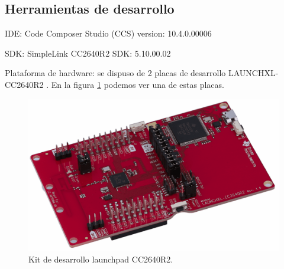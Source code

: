 \begin{enumerate}
\end{enumerate}

\subsection{Herramientas de desarrollo}
IDE: Code Composer Studio (CCS) version: 10.4.0.00006

SDK: SimpleLink CC2640R2 SDK: 5.10.00.02

Plataforma de hardware: se dispuso de 2 placas de desarrollo LAUNCHXL-CC2640R2 \citep{REF}. En la figura \ref{fig:kitDesarrolloCC2640R2} podemos ver una de estas placas.



\vspace{1cm}

\begin{figure}[htbp]
	\centering
	\includegraphics[width=.7\textwidth]{./Figures/LaunchpadCC2640R2.png}
	\caption{Kit de desarrollo launchpad CC2640R2.}
	\label{fig:kitDesarrolloCC2640R2}
\end{figure}

\vspace{1cm}
